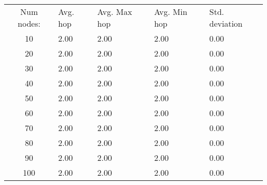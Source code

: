 \begin{tabular}{cllll}
Num nodes: & Avg. hop & Avg. Max hop & Avg. Min hop & Std. deviation \\
10       & 2.00        & 2.00            & 2.00 & 0.00 \\
20       & 2.00        & 2.00            & 2.00 & 0.00 \\
30       & 2.00        & 2.00            & 2.00 & 0.00 \\
40       & 2.00        & 2.00            & 2.00 & 0.00 \\
50       & 2.00        & 2.00            & 2.00 & 0.00 \\
60       & 2.00        & 2.00            & 2.00 & 0.00 \\
70       & 2.00        & 2.00            & 2.00 & 0.00 \\
80       & 2.00        & 2.00            & 2.00 & 0.00 \\
90       & 2.00        & 2.00            & 2.00 & 0.00 \\
100       & 2.00        & 2.00            & 2.00 & 0.00 \\
\end{tabular}